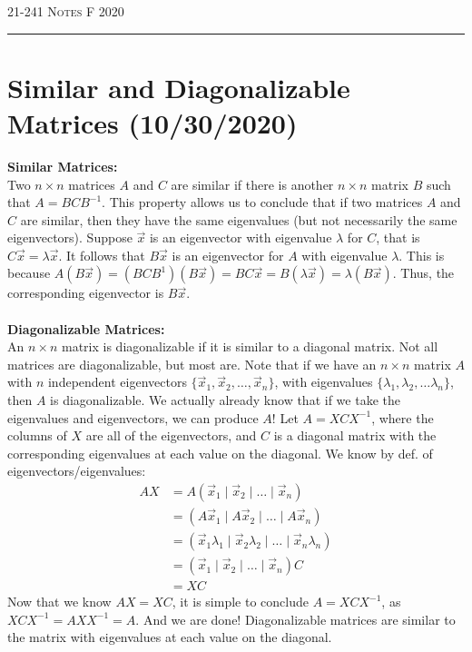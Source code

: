 \documentclass[12pt]{amsart}
\begin{document}
\thispagestyle{empty}

{\scshape 21-241} \hfill {\scshape \Large Notes} \hfill {\scshape F 2020}
\medskip
\hrule
\bigskip

\section*{Similar and Diagonalizable Matrices (10/30/2020)}
\textbf{Similar Matrices:}\\
Two $n \times n$ matrices $A$ and $C$ are similar if there is another $n \times n$ matrix $B$ such that $A=BCB^{-1}$. This property allows us to conclude that if two matrices $A$ and $C$ are similar, then they have the same eigenvalues (but not necessarily the same eigenvectors). Suppose $\vec{x}$ is an eigenvector with eigenvalue $\lambda$ for $C$, that is $C \vec{x} = \lambda \vec{x}$. It follows that $B\vec{x}$ is an eigenvector for $A$ with eigenvalue $\lambda$. This is because $A(B\vec{x}) = (BCB^{1})(B\vec{x})=BC\vec{x}=B(\lambda\vec{x})=\lambda(B\vec{x})$. Thus, the corresponding eigenvector is $B\vec{x}$.\\ \\
\textbf{Diagonalizable Matrices:}\\
An $n \times n$ matrix is diagonalizable if it is similar to a diagonal matrix. Not all matrices are diagonalizable, but most are. Note that if we have an $n \times n$ matrix $A$ with $n$ independent eigenvectors $\{\vec{x}_1, \vec{x}_2, \dots , \vec{x}_n\}$, with eigenvalues $\{\lambda_1, \lambda_2, \dots \lambda_n\}$, then $A$ is diagonalizable. We actually already know that if we take the eigenvalues and eigenvectors, we can produce $A$! Let $A = XCX^{-1}$, where the columns of $X$ are all of the eigenvectors, and $C$ is a diagonal matrix with the corresponding eigenvalues at each value on the diagonal. We know by def. of eigenvectors/eigenvalues:
\begin{align*}
	AX &= A (\vec{x}_1 \mid \vec{x}_2 \mid \dots \mid \vec{x}_n)\\
	   &= (A\vec{x}_1 \mid A\vec{x}_2 \mid \dots \mid A\vec{x}_n)\\
	   &= (\vec{x}_1\lambda_1 \mid \vec{x}_2\lambda_2 \mid \dots \mid \vec{x}_n\lambda_n)\\
	   &= (\vec{x}_1 \mid \vec{x}_2 \mid \dots \mid \vec{x}_n)C\\
	   &= XC
\end{align*}
Now that we know $AX = XC$, it is simple to conclude $A = XCX^{-1}$, as $XCX^{-1}=AXX^{-1}=A$. And we are done! Diagonalizable matrices are similar to the matrix with eigenvalues at each value on the diagonal.\\
\end{document}
